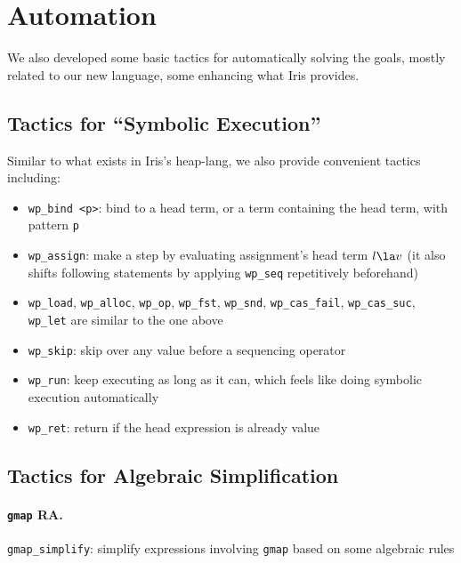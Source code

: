 \section{Automation}
\label{sec:auto}

We also developed some basic tactics for automatically solving the goals,
mostly related to our new language, some enhancing what Iris provides.

\subsection{Tactics for ``Symbolic Execution''}

Similar to what exists in Iris's heap-lang, we also provide convenient tactics
including:

\begin{itemize}
    \item \texttt{wp\_bind <p>}: bind to a head term, or a term containing the head term, with pattern \texttt{p}
    \item \texttt{wp\_assign}: make a step by evaluating assignment's head term $l \la v$
        (it also shifts following statements by applying \texttt{wp\_seq} repetitively beforehand)
    \item \texttt{wp\_load}, \texttt{wp\_alloc}, \texttt{wp\_op}, \texttt{wp\_fst},
        \texttt{wp\_snd}, \texttt{wp\_cas\_fail}, \texttt{wp\_cas\_suc}, \texttt{wp\_let}
        are similar to the one above
    \item \texttt{wp\_skip}: skip over any value before a sequencing operator
    \item \texttt{wp\_run}: keep executing as long as it can, which feels like doing
      symbolic execution automatically
    \item \texttt{wp\_ret}: return if the head expression is already value
\end{itemize}

\subsection{Tactics for Algebraic Simplification}

\paragraph{\texttt{gmap} RA.}

\texttt{gmap\_simplify}: simplify expressions involving \texttt{gmap} based on some algebraic rules

